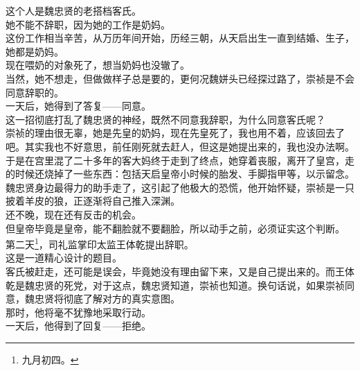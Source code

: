 \begin{multicols}{\theparacolNo}
这个人是魏忠贤的老搭档客氏。\\

她不能不辞职，因为她的工作是奶妈。\\

这份工作相当辛苦，从万历年间开始，历经三朝，从天启出生一直到结婚、生子，她都是奶妈。\\

现在喂奶的对象死了，想当奶妈也没辙了。\\

当然，她不想走，但做做样子总是要的，更何况魏姘头已经探过路了，崇祯是不会同意辞职的。\\

一天后，她得到了答复——同意。\\

这一招彻底打乱了魏忠贤的神经，既然不同意我辞职，为什么同意客氏呢？\\

崇祯的理由很无辜，她是先皇的奶妈，现在先皇死了，我也用不着，应该回去了吧。其实我也不好意思，前任刚死就去赶人，但这是她提出来的，我也没办法啊。\\

于是在宫里混了二十多年的客大妈终于走到了终点，她穿着丧服，离开了皇宫，走的时候还烧掉了一些东西：包括天启皇帝小时候的胎发、手脚指甲等，以示留念。\\

魏忠贤身边最得力的助手走了，这引起了他极大的恐慌，他开始怀疑，崇祯是一只披着羊皮的狼，正逐渐将自己推入深渊。\\

还不晚，现在还有反击的机会。\\

但皇帝毕竟是皇帝，能不翻脸就不要翻脸，所以动手之前，必须证实这个判断。\\

第二天\footnote{九月初四。}，司礼监掌印太监王体乾提出辞职。\\

这是一道精心设计的题目。\\

客氏被赶走，还可能是误会，毕竟她没有理由留下来，又是自己提出来的。而王体乾是魏忠贤的死党，对于这点，魏忠贤知道，崇祯也知道。换句话说，如果崇祯同意，魏忠贤将彻底了解对方的真实意图。\\

那时，他将毫不犹豫地采取行动。\\

一天后，他得到了回复——拒绝。\\


\end{multicols}
